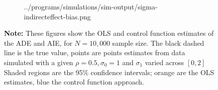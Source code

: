 \begin{figure}[h!]
\begin{subfigure}[c]{0.475\textwidth}
{            ../programs/simulations/sim-output/sigma-indirecteffect-bias.png}
    \end{subfigure}
    \label{fig:sigma-bias}
    \justify
    \footnotesize    
    \textbf{Note:}
    These figures show the OLS and control function estimates of the ADE and AIE, for $N = 10,000$ sample size.
    The black dashed line is the true value, points are points estimates from data simulated with a given $\rho = 0.5, \sigma_0 = 1$ and $\sigma_1$ varied across $[0, 2]$
    Shaded regions are the 95\% confidence intervals;
    orange are the OLS estimates, blue the control function approach.
\end{figure}
